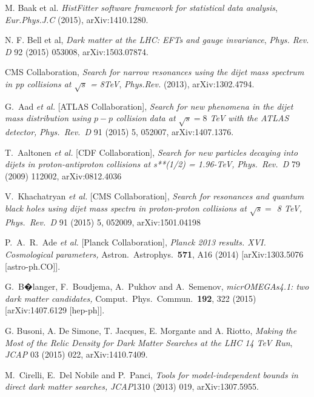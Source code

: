  M. Baak et al. \emph{HistFitter software framework for statistical data analysis}, \emph{Eur.Phys.J.C} (2015), arXiv:1410.1280.

 N. F. Bell et al, \emph{Dark matter at the LHC: EFTs and gauge invariance}, \emph{Phys. Rev. D} 92 (2015) 053008, arXiv:1503.07874.

 CMS Collaboration, \emph{
Search for narrow resonances using the dijet mass spectrum in pp collisions at $\sqrt{s}$ = 8TeV}, \emph{Phys.Rev.} (2013), arXiv:1302.4794.

 G.~Aad {\it et al.} [ATLAS Collaboration],
 \emph{Search for new phenomena in the dijet mass distribution using $p-p$ collision data at $\sqrt{s}=8$ TeV with the ATLAS detector,}
  \emph{Phys.\ Rev.\ D} 91 (2015) 5,  052007, arXiv:1407.1376.

 T.~Aaltonen {\it et al.} [CDF Collaboration],
  \emph{Search for new particles decaying into dijets in proton-antiproton collisions at s**(1/2) = 1.96-TeV,}
  \emph{Phys.\ Rev.\ D}  79 (2009) 112002,
  arXiv:0812.4036

 V.~Khachatryan {\it et al.} [CMS Collaboration],
  \emph{Search for resonances and quantum black holes using dijet mass spectra in proton-proton collisions at $\sqrt{s} =$ 8 TeV,}
  \emph{Phys.\ Rev.\ D}   91 (2015) 5,  052009,
  arXiv:1501.04198

 P.~A.~R.~Ade {\it et al.}  [Planck Collaboration],
\emph{Planck 2013 results. XVI. Cosmological parameters,}
  Astron.\ Astrophys.\  {\bf 571}, A16 (2014)
  [arXiv:1303.5076 [astro-ph.CO]].

 G.~B�langer, F.~Boudjema, A.~Pukhov and A.~Semenov,
\emph{micrOMEGAs4.1: two dark matter candidates,}
  Comput.\ Phys.\ Commun.\  {\bf 192}, 322 (2015)
  [arXiv:1407.6129 [hep-ph]].

 G. Busoni, A. De Simone, T. Jacques, E. Morgante and A. Riotto, \emph{Making the Most of the Relic Density for Dark Matter Searches at the LHC 14 TeV Run}, \emph{JCAP} 03 (2015) 022, arXiv:1410.7409.

 M.~Cirelli, E.~Del Nobile and P.~Panci,
  \emph{Tools for model-independent bounds in direct dark matter searches,}
  \emph{JCAP}1310 (2013) 019, arXiv:1307.5955.

